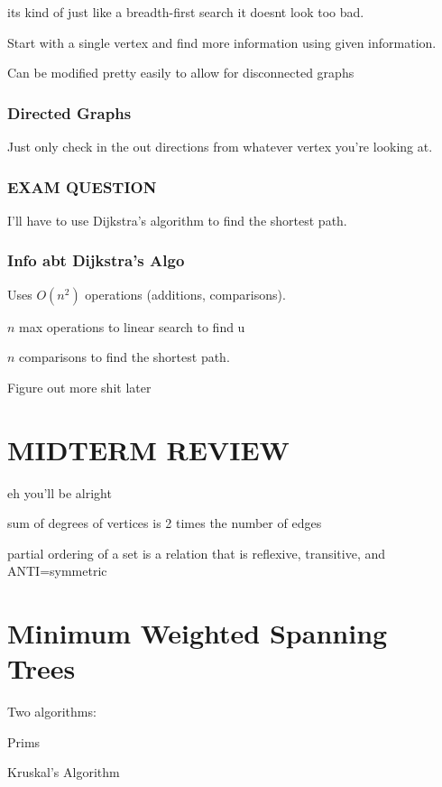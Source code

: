 \documentclass{report}
\begin{document}
its kind of just like a breadth-first search it doesnt look too bad.

Start with a single vertex and find more information using given information.

Can be modified pretty easily to allow for disconnected graphs
\subsection{Directed Graphs}
Just only check in the out directions from whatever vertex you're looking at.

\subsection{EXAM QUESTION}
I'll have to use Dijkstra's algorithm to find the shortest path.

\subsection{Info abt Dijkstra's Algo}
Uses $O(n^2)$ operations (additions, comparisons).

$n$ max operations to linear search to find u

$n$ comparisons to find the shortest path.

Figure out more shit later

\chapter{MIDTERM REVIEW}
eh you'll be alright

sum of degrees of vertices is 2 times the number of edges

partial ordering of a set is a relation that is reflexive, transitive, and ANTI=symmetric




\chapter{Minimum Weighted Spanning Trees}
Two algorithms:

Prims

Kruskal's Algorithm
\end{document}
